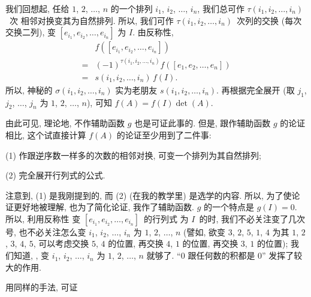 \documentclass[%
    UTF8,%
    fontset=none,%
    punct=kaiming,%
    zihao=-4,%
    a4paper,%
    oneside,%
]{ctexbook}
\let\emph\relax
\begin{document}
我们回想起,
任给 \(1\), \(2\), \(\dots\), \(n\)
的一个排列 \(i_1\), \(i_2\), \(\dots\), \(i_n\),
我们总可作 \(\tau (i_1, i_2, \dots, i_n)\)~次%
相邻对换变其为自然排列.
所以, 我们可作
\(\tau (i_1, i_2, \dots, i_n)\)~次列的交换
(每次交换二列),
变 \([e_{i_1}, e_{i_2}, \dots, e_{i_n}]\) 为 \(I\).
由反称性,
\begin{align*}
         & f([e_{i_1}, e_{i_2}, \dots, e_{i_n}])
    \\
    = {} & (-1)^{\tau (i_1, i_2, \dots, i_n)}
    f([e_1, e_2, \dots, e_n])                    \\
    = {} & s(i_1, i_2, \dots, i_n)\, f(I).
\end{align*}
所以, 神秘的 \(\sigma (i_1, i_2, \dots, i_n)\)
实为老朋友 \(s(i_1, i_2, \dots, i_n)\).
再根据完全展开
(取 \(j_1\), \(j_2\), \(\dots\), \(j_n\)
为 \(1\), \(2\), \(\dots\), \(n\)),
可知 \(f(A) = f(I) \det {(A)}\).

由此可见, 理论地, 不作辅助函数 \(g\) 也是可证此事的.
但是, 跟作辅助函数 \(g\) 的论证相比,
这个试直接计算 \(f(A)\) 的论证至少用到了二件事:

(1)
作跟逆序数一样多的次数的相邻对换,
可变一个排列为其自然排列;

(2)
完全展开行列式的公式.

注意到, (1) 是我刚提到的, 而 (2)
(在我的教学里) 是选学的内容.
所以, 为了使论证更好地被理解,
也为了简化论证,
我作了辅助函数.
\(g\) 的一个特点是 \(g(I) = 0\).
所以, 利用反称性%
变 \([e_{i_1}, e_{i_2}, \dots, e_{i_n}]\)~的行列式
为 \(I\)~的时,
我们不必关注变了几次号,
也不必关注怎么变
\(i_1\), \(i_2\), \(\dots\), \(i_n\)
为 \(1\), \(2\), \(\dots\), \(n\)
(譬如, 欲变 \(3\), \(2\), \(5\), \(1\), \(4\)
为其 \(1\), \(2\), \(3\), \(4\), \(5\),
可以考虑交换 \(5\), \(4\) 的位置,
再交换 \(4\), \(1\) 的位置,
再交换 \(3\), \(1\) 的位置);
我们知道, \emph{可适当地交换文字的位置},
变 \(i_1\), \(i_2\), \(\dots\), \(i_n\)
为 \(1\), \(2\), \(\dots\), \(n\)
就够了.
``\(0\) 跟任何数的积都是 \(0\)''
发挥了较大的作用.

用同样的手法, 可证
\end{document}
